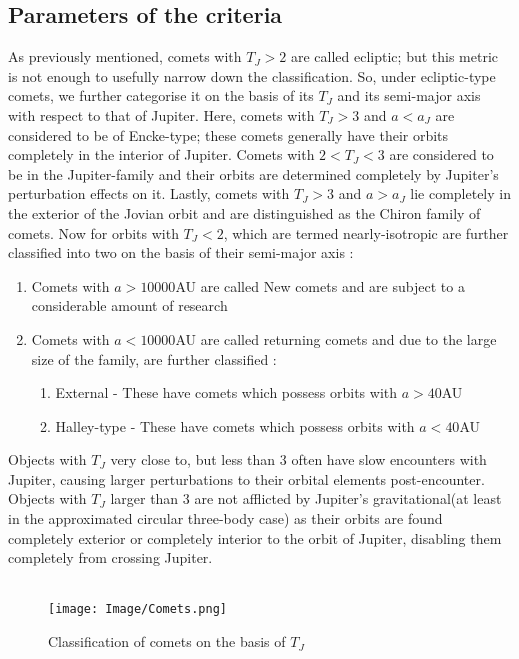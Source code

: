 \documentclass{article}
\begin{document}
\subsection{Parameters of the criteria}
As previously mentioned, comets with $T_J>2$ are called ecliptic; but this metric is not enough to usefully narrow down the classification. So, under ecliptic-type comets, we further categorise it on the basis of its $T_J$ and its semi-major axis with respect to that of Jupiter. Here, comets with $T_J>3$ and $a<a_J$ are considered to be of Encke-type; these comets generally have their orbits completely in the interior of Jupiter. Comets with $2<T_J<3$ are considered to be in the Jupiter-family and their orbits are determined completely by Jupiter's perturbation effects on it. Lastly, comets with $T_J>3$ and $a>a_J$ lie completely in the exterior of the Jovian orbit and are distinguished as the Chiron family of comets. 
Now for orbits with $T_J<2$, which are termed nearly-isotropic are further classified into two on the basis of their semi-major axis :
\begin{enumerate}
    \item Comets with $a>10000$AU are called New comets and are subject to a considerable amount of research
    \item Comets with $a<10000$AU are called returning comets and due to the large size of the family, are further classified : 
        \begin{enumerate}
            \item External - These have comets which possess orbits with $a>40$AU
            \item Halley-type - These have comets which possess orbits with $a<40$AU
        \end{enumerate}
            
\end{enumerate}



Objects with $T_J$ very close to, but less than $3$ often have slow encounters with Jupiter, causing larger perturbations to their orbital elements post-encounter. Objects with $T_J$ larger than $3$ are not afflicted by Jupiter's gravitational(at least in the approximated circular three-body case) as their orbits are found completely exterior or completely interior to the orbit of Jupiter, disabling them completely from crossing Jupiter. 
\\ 
\\
\begin{figure}[htbp]
    \centering
    \texttt{[image: Image/Comets.png]}
    \caption{Classification of comets on the basis of $T_J$}
    \label{fig:enter-label}
\end{figure}
\end{document}
